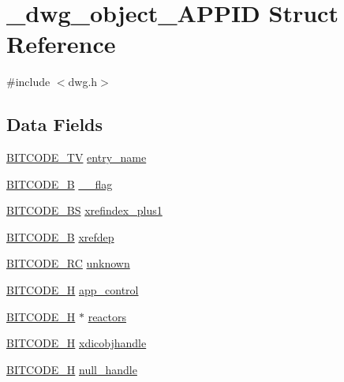 \hypertarget{struct__dwg__object__APPID}{\section{\-\_\-dwg\-\_\-object\-\_\-\-A\-P\-P\-I\-D \-Struct \-Reference}
\label{struct__dwg__object__APPID}
}


{\ttfamily \#include $<$dwg.\-h$>$}

\subsection*{\-Data \-Fields}
\begin{DoxyCompactItemize}
\item 
\hyperlink{dwg_8h_a2a7e040c6e36ca039b03608679ecaf7c}{\-B\-I\-T\-C\-O\-D\-E\-\_\-\-T\-V} \hyperlink{struct__dwg__object__APPID_a88e2e23e9c6690aed21a627903b42ea4}{entry\-\_\-name}
\item 
\hyperlink{dwg_8h_ab533b1f62d9086749e3bb5b67e9f224e}{\-B\-I\-T\-C\-O\-D\-E\-\_\-\-B} \hyperlink{struct__dwg__object__APPID_aa37bc6ab1c8a5eacb733dc966543b969}{\-\_\-\_\-flag}
\item 
\hyperlink{dwg_8h_a94297606fbd4a4ff97e8add284af0809}{\-B\-I\-T\-C\-O\-D\-E\-\_\-\-B\-S} \hyperlink{struct__dwg__object__APPID_a5c0788e6875df8ed3ba5afaef1329c53}{xrefindex\-\_\-plus1}
\item 
\hyperlink{dwg_8h_ab533b1f62d9086749e3bb5b67e9f224e}{\-B\-I\-T\-C\-O\-D\-E\-\_\-\-B} \hyperlink{struct__dwg__object__APPID_a160b1701472989f7926855a40140539a}{xrefdep}
\item 
\hyperlink{dwg_8h_a7fd199a8f9c9cc52bdab220f65a2a619}{\-B\-I\-T\-C\-O\-D\-E\-\_\-\-R\-C} \hyperlink{struct__dwg__object__APPID_a95bd46eaecb4d753a25710c381dd38f5}{unknown}
\item 
\hyperlink{dwg_8h_a7c700e94e047a97ba8c24bdfe4029dc3}{\-B\-I\-T\-C\-O\-D\-E\-\_\-\-H} \hyperlink{struct__dwg__object__APPID_a8805f1920c5b08a35287600a0d682503}{app\-\_\-control}
\item 
\hyperlink{dwg_8h_a7c700e94e047a97ba8c24bdfe4029dc3}{\-B\-I\-T\-C\-O\-D\-E\-\_\-\-H} $\ast$ \hyperlink{struct__dwg__object__APPID_a83cd02a2f9e83bd8c977508756fc5bd6}{reactors}
\item 
\hyperlink{dwg_8h_a7c700e94e047a97ba8c24bdfe4029dc3}{\-B\-I\-T\-C\-O\-D\-E\-\_\-\-H} \hyperlink{struct__dwg__object__APPID_adb8178012cccf5180302078119e6820d}{xdicobjhandle}
\item 
\hyperlink{dwg_8h_a7c700e94e047a97ba8c24bdfe4029dc3}{\-B\-I\-T\-C\-O\-D\-E\-\_\-\-H} \hyperlink{struct__dwg__object__APPID_a9bee279b3f577717cab0c95a89206dd2}{null\-\_\-handle}
\end{DoxyCompactItemize}


